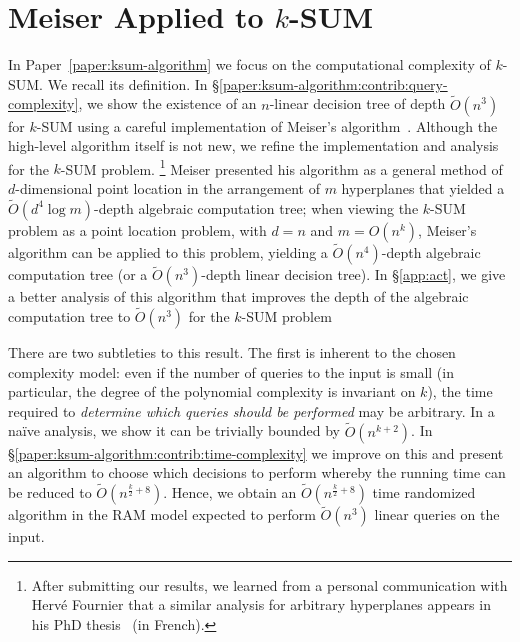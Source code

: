 \section{Meiser Applied to \texorpdfstring{\(k\)-SUM}{k-SUM}}%
\label{sec:contribution:ksum-algorithm}

In Paper~\ref{paper:ksum-algorithm}
we focus on the computational complexity of \(k\)-SUM\@. We recall its
definition.
%
\ProblemKSUM*
%
In \S\ref{paper:ksum-algorithm:contrib:query-complexity}, we show the existence of an $n$-linear
decision tree of depth $\tilde{O}(n^3)$ for \(k\)-SUM using a careful
implementation of Meiser's algorithm~\cite{M93}.
%
Although the high-level algorithm itself is not new, we refine the
implementation and analysis for the \(k\)-SUM problem.%
\footnote{After submitting our results, we learned from a personal communication
with Herv\'e Fournier that a similar analysis for arbitrary hyperplanes appears in his PhD
thesis~\cite{F01} (in French).}
%
Meiser presented his algorithm as a general method of
$d$-dimensional
point location in the
arrangement of $m$ hyperplanes that yielded a
$\tilde{O}(d^4 \log m)$-depth algebraic computation tree;
%
when viewing the \(k\)-SUM problem as a point
location problem, with \(d=n\) and \(m = O(n^k)\),
Meiser's algorithm can be applied
to this problem, yielding
a \(\tilde{O}(n^4)\)-depth algebraic computation tree
(or a \(\tilde{O}(n^3)\)-depth linear decision tree).
%
In \S\ref{app:act},
we give a better analysis of this algorithm that
improves the depth of the algebraic computation tree to
\( \tilde{O}(n^3) \) for the \(k\)-SUM problem

There are two subtleties to this result. The first is inherent to the chosen
complexity model: even if the number of queries to the input is small (in
particular, the degree of the polynomial complexity is invariant on $k$), the
time required to \emph{determine which queries should be performed} may be
arbitrary. In a na\"ive analysis, we show it can be trivially bounded by
$\tilde{O}(n^{k+2})$.
%
%
In \S\ref{paper:ksum-algorithm:contrib:time-complexity} we improve on this and present an
algorithm to choose which decisions to perform whereby the running time can be
reduced to $\tilde{O}(n^{\frac{k}{2}+8})$. Hence, we obtain an
$\tilde{O}(n^{\frac{k}{2}+8})$ time randomized algorithm in the RAM model
expected to perform $\tilde{O}(n^3)$ linear queries on the input.
%


